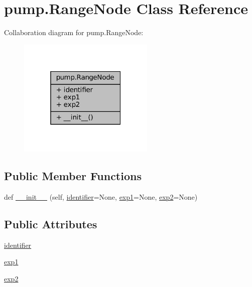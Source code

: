 \hypertarget{classpump_1_1RangeNode}{}\section{pump.\+Range\+Node Class Reference}
\label{classpump_1_1RangeNode}


Collaboration diagram for pump.\+Range\+Node\+:
\nopagebreak
\begin{figure}[H]
\begin{center}
\leavevmode
\includegraphics[width=184pt]{classpump_1_1RangeNode__coll__graph}
\end{center}
\end{figure}
\subsection*{Public Member Functions}
\begin{DoxyCompactItemize}
\item 
def \hyperlink{classpump_1_1RangeNode_a58e85945a5a6e2f899e8243422c871e3}{\+\_\+\+\_\+init\+\_\+\+\_\+} (self, \hyperlink{classpump_1_1RangeNode_ae75b9f31ba8c3bd048cf09b22035efa0}{identifier}=None, \hyperlink{classpump_1_1RangeNode_acbb59f8c5e23d23563ca03f21574ce63}{exp1}=None, \hyperlink{classpump_1_1RangeNode_afe153ee472b121652a51c62c1522cc13}{exp2}=None)
\end{DoxyCompactItemize}
\subsection*{Public Attributes}
\begin{DoxyCompactItemize}
\item 
\hyperlink{classpump_1_1RangeNode_ae75b9f31ba8c3bd048cf09b22035efa0}{identifier}
\item 
\hyperlink{classpump_1_1RangeNode_acbb59f8c5e23d23563ca03f21574ce63}{exp1}
\item 
\hyperlink{classpump_1_1RangeNode_afe153ee472b121652a51c62c1522cc13}{exp2}
\end{DoxyCompactItemize}


